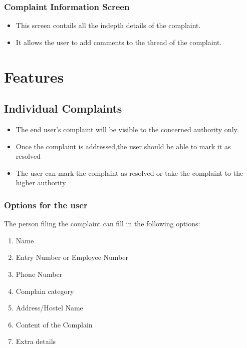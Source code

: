 \documentclass{article}
\begin{document}
			\subsubsection{Complaint Information Screen}
				\begin{itemize}
				\item This screen contails all the indepth details of the complaint.
				\item It allows the user to add comments to the thread of the complaint.
				\end{itemize}


	\section{Features}
		\subsection{Individual Complaints}
		\begin{itemize}
		\item The end user's complaint will be visible to the concerned authority only.
		\item Once the complaint is addressed,the user should be able to mark it as resolved
		\item The user can mark the complaint as resolved or take the complaint to the higher authority
		\end{itemize}
			\subsubsection{Options for the user}
				The person filing the complaint can fill in the following options:
				\begin{enumerate}
					\item Name
					\item Entry Number or Employee Number
					\item Phone Number
					\item Complain category
					\item Address/Hostel Name
					\item Content of the Complain
					\item Extra details
				\end{enumerate}
\end{document}
